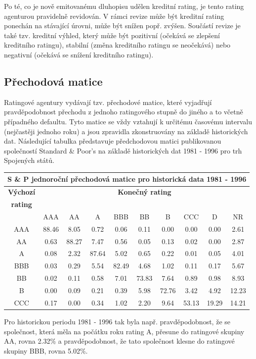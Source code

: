 \documentclass[a4paper]{book}
\begin{document}
Po té, co je nově emitovanému dluhopisu udělen kreditní rating, je tento rating agenturou pravidelně revidován. V rámci revize může být kreditní rating ponechán na stávající úrovni, může být snížen popř. zvýšen. Součástí revize je také tzv. kreditní výhled, který může být pozitivní (očekává se zlepšení kreditního ratingu), stabilní (změna kreditního ratingu se neočekává) nebo negativní (očekává se snížení kreditního ratingu).

\subsection{Přechodová matice}

Ratingové agentury vydávají tzv. přechodové matice, které vyjadřují pravděpodobnost přechodu z jednoho ratingového stupně do jiného a to včetně případného defaultu. Tyto matice se vždy vztahují k určitému časovému intervalu (nejčastěji jednoho roku) a jsou zpravidla zkonstruovány na základě historických dat. Následující tabulka představuje předchodovou matici publikovanou společností Standard \& Poor's na základě historických dat 1981 - 1996 pro trh Spojených států. 
\begin{center}
\begin{tabular}{c c c c c c c c c c}
\multicolumn{10}{c}{\textbf{S \& P jednoroční přechodová matice pro historická data 1981 - 1996}} \\
\hline
\textbf{Výchozí} & \multicolumn{9}{c}{\textbf{Konečný rating}}\\
\textbf{rating}  & \\
\hline
    & AAA   & AA    & A     & BBB   & BB    & B     & CCC  & D      & NR \\
AAA & 88.46 & 8.05  & 0.72  & 0.06  & 0.11  & 0.00  & 0.00  & 0.00  & 2.61 \\
AA  & 0.63  & 88.27 & 7.47  & 0.56  & 0.05  & 0.13  & 0.02  & 0.00  & 2.87 \\
A   & 0.08  & 2.32  & 87.64 & 5.02  & 0.65  & 0.22  & 0.01  & 0.05  & 4.01 \\
BBB & 0.03  & 0.29  & 5.54  & 82.49 & 4.68  & 1.02  & 0.11  & 0.17  & 5.67 \\
BB  & 0.02  & 0.11  & 0.58  & 7.01  & 73.83 & 7.64  & 0.89  & 0.98  & 8.93 \\
B   & 0.00  & 0.09  & 0.21  & 0.39  & 5.98  & 72.76 & 3.42  & 4.92  & 12.23 \\
CCC & 0.17  & 0.00  & 0.34  & 1.02  & 2.20  & 9.64  & 53.13 & 19.29 & 14.21 \\
\end{tabular}
\end{center}
Pro historickou periodu 1981 - 1996 tak byla např. pravděpodobnost, že se společnost, která měla na počátku roku rating A, přesune do ratingové skupiny AA, rovna 2.32\% a pravděpodobnost, že tato společnost klesne do ratingové skupiny BBB, rovna 5.02\%.
\end{document}
